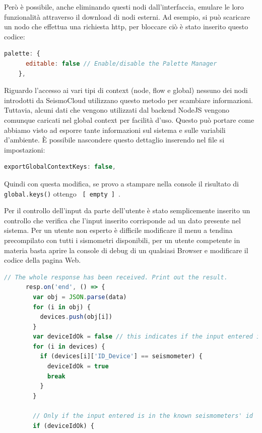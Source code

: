 \documentclass[a4paper,10pt]{memoir}
\begin{document}
Però è possibile, anche eliminando questi nodi dall'interfaccia, emulare le loro funzionalità attraverso il download di nodi esterni.
Ad esempio, si può scaricare un nodo che effettua una richiesta http, per bloccare ciò è stato inserito questo codice:
\begin{lstlisting}[language=Javascript, firstnumber=93]
    palette: {
      editable: false // Enable/disable the Palette Manager
    },
\end{lstlisting}

Riguardo l'accesso ai vari tipi di context (node, flow e global) nessuno dei nodi introdotti da SeismoCloud utilizzano questo metodo per scambiare informazioni.
Tuttavia, alcuni dati che vengono utilizzati dal backend NodeJS vengono comunque caricati nel global context per facilità d'uso. Questo può portare come abbiamo visto ad esporre tante informazioni sul sistema e sulle variabili d'ambiente.
È possibile nascondere questo dettaglio inserendo nel file si impostazioni:
\begin{lstlisting}[language=Javascript, firstnumber=56]
exportGlobalContextKeys: false,
\end{lstlisting}
Quindi con questa modifica, se provo a stampare nella console il risultato di \texttt{global.keys()} ottengo \texttt{ [ empty ] }.

Per il controllo dell'input da parte dell'utente è stato semplicemente inserito un controllo che verifica che l'input inserito corrisponde ad un dato presente nel sistema.
Per un utente non esperto è difficile modificare il menu a tendina precompilato con tutti i sismometri disponibili, per un utente competente in materia basta aprire la console di debug di un qualsiasi Browser e modificare il codice della pagina Web.
\begin{lstlisting}[language=Javascript, firstnumber=34]
    // The whole response has been received. Print out the result.
      resp.on('end', () => {
        var obj = JSON.parse(data)
        for (i in obj) {
          devices.push(obj[i])
        }
        var deviceIdOk = false // this indicates if the input entered is in the group seismometers
        for (i in devices) {
          if (devices[i]['ID_Device'] == seismometer) {
            deviceIdOk = true
            break
          }
        }

        // Only if the input entered is in the known seismometers' id
        if (deviceIdOk) {
\end{lstlisting}
\end{document}
